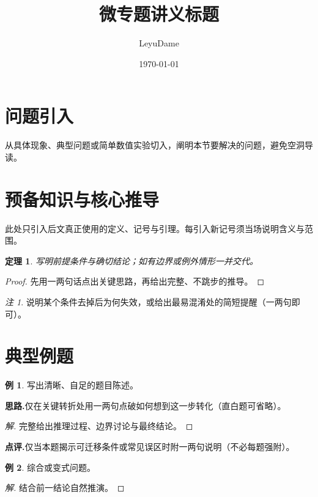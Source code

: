 \documentclass[11pt,a4paper,fontset=fandol]{ctexart}
\title{微专题讲义标题}
\author{LeyuDame}
\date{\today}
\theoremstyle{definition}
\newtheorem{example}{例}
\theoremstyle{plain}
\newtheorem{theorem}{定理}
\theoremstyle{remark}
\newtheorem*{remark}{注}
\begin{document}
\maketitle

\section{问题引入}

从具体现象、典型问题或简单数值实验切入，阐明本节要解决的问题，避免空洞导读。

\section{预备知识与核心推导}

此处只引入后文真正使用的定义、记号与引理。每引入新记号须当场说明含义与范围。

\begin{theorem}
写明前提条件与确切结论；如有边界或例外情形一并交代。
\end{theorem}

\begin{proof}
先用一两句话点出关键思路，再给出完整、不跳步的推导。
\end{proof}

\begin{remark}
说明某个条件去掉后为何失效，或给出最易混淆处的简短提醒（一两句即可）。
\end{remark}

\section{典型例题}

\begin{example}
写出清晰、自足的题目陈述。
\end{example}

\noindent\textbf{思路.}\quad 仅在关键转折处用一两句点破如何想到这一步转化（直白题可省略）。

\begin{proof}[解]
完整给出推理过程、边界讨论与最终结论。
\end{proof}

\noindent\textbf{点评.}\quad 仅当本题揭示可迁移条件或常见误区时附一两句说明（不必每题强附）。

\begin{example}
综合或变式问题。
\end{example}

\begin{proof}[解]
结合前一结论自然推演。
\end{proof}
\end{document}
